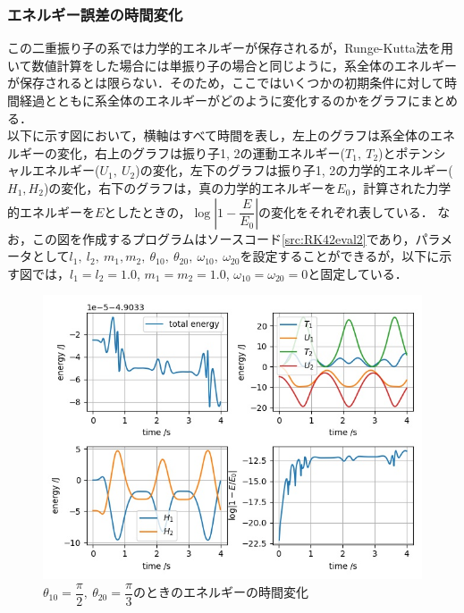 \documentclass[a4paper,11pt]{jsarticle}
\begin{document}
\subsubsection{エネルギー誤差の時間変化}
この二重振り子の系では力学的エネルギーが保存されるが，Runge-Kutta法を用いて数値計算をした場合には単振り子の場合と同じように，系全体のエネルギーが保存されるとは限らない．そのため，ここではいくつかの初期条件に対して時間経過とともに系全体のエネルギーがどのように変化するのかをグラフにまとめる．\\
以下に示す図において，横軸はすべて時間を表し，左上のグラフは系全体のエネルギーの変化，右上のグラフは振り子1, 2の運動エネルギー(\(T_1,\ T_2\))とポテンシャルエネルギー(\(U_1,\ U_2\))の変化，左下のグラフは振り子1, 2の力学的エネルギー(\(H_1, H_2\))の変化，右下のグラフは，真の力学的エネルギーを\(E_0\)，計算された力学的エネルギーを\(E\)としたときの，\(\log \left|1-\dfrac{E}{E_0}\right|\)の変化をそれぞれ表している．
なお，この図を作成するプログラムはソースコード\ref{src:RK42eval2}であり，パラメータとして\(l_1,\ l_2,\ m_1, m_2,\ \theta_{10},\ \theta_{20},\ \omega_{10},\ \omega_{20}\)を設定することができるが，以下に示す図では，\(l_1 = l_2 = 1.0\), \(m_1 = m_2 = 1.0\), \(\omega_{10} = \omega_{20} = 0\)と固定している．
\begin{figure}[H]
  \begin{center}
    \includegraphics{figure/RK42/evaluation2/pi2_pi3_2021-2-9-132931.jpeg}
    \caption{\(\theta_{10} = \dfrac{\pi}{2},\ \theta_{20}  = \dfrac{\pi}{3}\)のときのエネルギーの時間変化}
    \label{fig:RK42-eval2-pi2-pi3}
  \end{center}
\end{figure}
\end{document}
